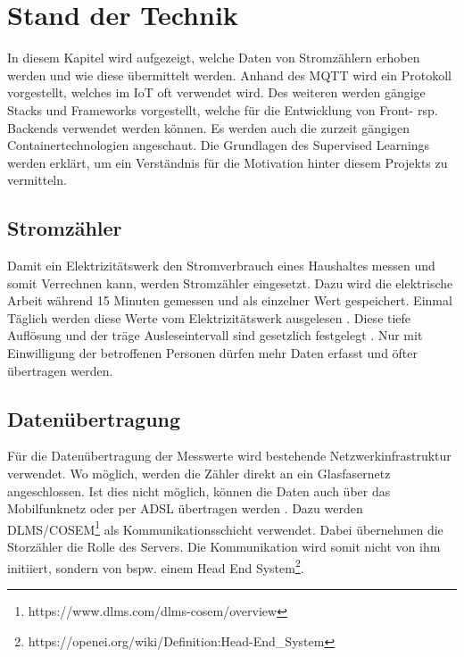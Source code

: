 \chapter{Stand der Technik}

In diesem Kapitel wird aufgezeigt,
welche Daten von Stromzählern erhoben werden und wie diese übermittelt werden.
Anhand des \ac{MQTT} wird ein Protokoll vorgestellt, welches im \ac{IoT} oft verwendet wird.
Des weiteren werden gängige Stacks und Frameworks vorgestellt,
welche für die Entwicklung von Front- rsp. Backends verwendet werden können.
Es werden auch die zurzeit gängigen Containertechnologien angeschaut.
Die Grundlagen des Supervised Learnings werden erklärt,
um ein Verständnis für die Motivation hinter diesem Projekts zu vermitteln.


\section{Stromzähler}
Damit ein Elektrizitätswerk den Stromverbrauch eines Haushaltes messen und somit Verrechnen kann, werden Stromzähler eingesetzt.
Dazu wird die elektrische Arbeit während 15 Minuten gemessen und als einzelner Wert gespeichert.
Einmal Täglich werden diese Werte vom Elektrizitätswerk ausgelesen \parencite{smart_meter_faq}.
Diese tiefe Auflösung und der träge Ausleseintervall sind gesetzlich festgelegt \parencite{admin_strom_VV_art8d}.
Nur mit Einwilligung der betroffenen Personen dürfen mehr Daten erfasst und öfter übertragen werden.

\section{Datenübertragung}
Für die Datenübertragung der Messwerte wird bestehende Netzwerkinfrastruktur verwendet.
Wo möglich, werden die Zähler direkt an ein Glasfasernetz angeschlossen.
Ist dies nicht möglich, können die Daten auch über das Mobilfunknetz oder per ADSL übertragen werden \parencite{smart_meter_faq}.  %
Dazu werden DLMS/COSEM\footnote{https://www.dlms.com/dlms-cosem/overview} als Kommunikationsschicht verwendet.
Dabei übernehmen die Storzähler die Rolle des Servers.
Die Kommunikation wird somit nicht von ihm initiiert,
sondern von bspw. einem Head End System\footnote{https://openei.org/wiki/Definition:Head-End\_System}.

